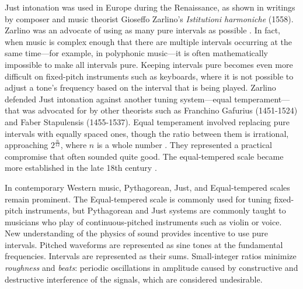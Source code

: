 Just intonation was used in Europe during the Renaissance, as shown in writings by composer and music theorist Gioseffo Zarlino's \textit{Istitutioni harmoniche} (1558). Zarlino was an advocate of using as many pure intervals as possible \cite{goldman1991new}. In fact, when music is complex enough that there are multiple intervals occurring at the same time---for example, in polyphonic music---it is often mathematically impossible to make all intervals pure. Keeping intervals pure becomes even more difficult on fixed-pitch instruments such as keyboards, where it is not possible to adjust a tone's frequency based on the interval that is being played. Zarlino defended Just intonation against another tuning system---equal temperament---that was advocated for by other theorists such as Franchino Gafurius (1451-1524) and Faber Stapulensis (1455-1537). Equal temperament involved replacing pure intervals with equally spaced ones, though the ratio between them is irrational, approaching $2^\frac{n}{12}$, where $n$ is a whole number \cite{goldman1991new}. They represented a practical compromise that often sounded quite good. The equal-tempered scale became more established in the late 18th century \cite{equaltemperament}.

In contemporary Western music, Pythagorean, Just, and Equal-tempered scales remain prominent. The Equal-tempered scale is commonly used for tuning fixed-pitch instruments, but Pythagorean and Just systems are commonly taught to musicians who play of continuous-pitched instruments such as violin or voice. New understanding of the physics of sound provides incentive to use pure intervals. Pitched waveforms are represented as sine tones at the fundamental frequencies. Intervals are represented as their sums. Small-integer ratios minimize \textit{roughness} and \textit{beats}: periodic oscillations in amplitude caused by constructive and destructive interference of the signals, which are considered undesirable.

